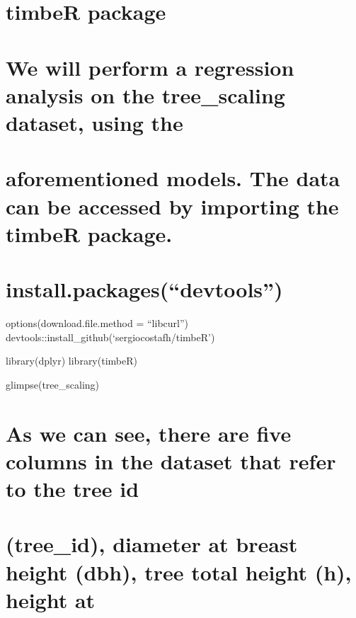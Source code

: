 \documentclass[
]{article}
\begin{document}
\hypertarget{timber-package}{%
\section{timbeR package}\label{timber-package}}

\hypertarget{we-will-perform-a-regression-analysis-on-the-tree_scaling-dataset-using-the}{%
\section{We will perform a regression analysis on the tree\_scaling
dataset, using
the}\label{we-will-perform-a-regression-analysis-on-the-tree_scaling-dataset-using-the}}

\hypertarget{aforementioned-models.-the-data-can-be-accessed-by-importing-the-timber-package.}{%
\section{aforementioned models. The data can be accessed by importing
the timbeR
package.}\label{aforementioned-models.-the-data-can-be-accessed-by-importing-the-timber-package.}}

\hypertarget{install.packagesdevtools}{%
\section{install.packages(``devtools'')}\label{install.packagesdevtools}}

options(download.file.method = ``libcurl'')
devtools::install\_github(`sergiocostafh/timbeR')

library(dplyr) library(timbeR)

glimpse(tree\_scaling)

\hypertarget{as-we-can-see-there-are-five-columns-in-the-dataset-that-refer-to-the-tree-id}{%
\section{As we can see, there are five columns in the dataset that refer
to the tree
id}\label{as-we-can-see-there-are-five-columns-in-the-dataset-that-refer-to-the-tree-id}}

\hypertarget{tree_id-diameter-at-breast-height-dbh-tree-total-height-h-height-at}{%
\section{(tree\_id), diameter at breast height (dbh), tree total height
(h), height
at}\label{tree_id-diameter-at-breast-height-dbh-tree-total-height-h-height-at}}
\end{document}
